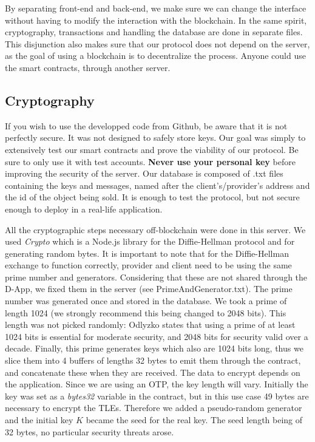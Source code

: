 \documentclass[conference]{IEEEtran}
\begin{document}
By separating front-end and back-end, we make sure we can change the interface without having to modify the interaction with the blockchain. In the same spirit, cryptography, transactions and handling the database are done in separate files. This disjunction also makes sure that our protocol does not depend on the server, as the goal of using a blockchain is to decentralize the process. Anyone could use the smart contracts, through another server.

\subsection{Cryptography}
If you wish to use the developped code from Github\cite{GitHub}, be aware that it is not perfectly secure. It was not designed to safely store keys. Our goal was simply to extensively test our smart contracts and prove the viability of our protocol. Be sure to only use it with test accounts. \textbf{Never use your personal key} before improving the security of the server. Our database is composed of .txt files containing the keys and messages, named after the client's/provider's address and the id of the object being sold. It is enough to test the protocol, but not secure enough to deploy in a real-life application.

All the cryptographic steps necessary off-blockchain were done in this server. We used \textit{Crypto}\cite{Crypto} which is a Node.js library for the Diffie-Hellman protocol and for generating random bytes. It is important to note that for the Diffie-Hellman exchange to function correctly, provider and client need to be using the same prime number and generators. Considering that these are not shared through the D-App, we fixed them in the server (see PrimeAndGenerator.txt). The prime number was generated once and stored in the database. We took a prime of length 1024 (we strongly recommend this being changed to 2048 bits). This length was not picked randomly: Odlyzko\cite{odlyzko} states that using a prime of at least 1024 bits is essential for moderate security, and 2048 bits for security valid over a decade. Finally, this prime generates keys which also are 1024 bits long, thus we slice them into 4 buffers of lengths 32 bytes to emit them through the contract, and concatenate these when they are received. The data to encrypt depends on the application. Since we are using an OTP, the key length will vary.
Initially the key was set as a \textit{bytes32} variable in the contract, but in this use case 49 bytes are necessary to encrypt the TLEs. Therefore we added a pseudo-random generator and the initial key $K$ became the seed for the real key. The seed length being of 32 bytes, no particular security threats arose.
\end{document}
